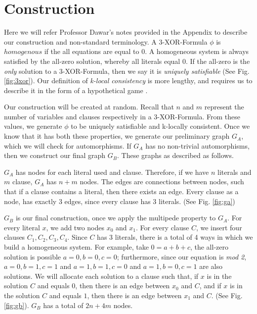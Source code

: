\newpage
\section[Construction]{Construction}
Here we will refer Professor Dawar's notes provided in the Appendix to describe our construction and non-standard terminology. A 3-XOR-Formula $\phi$ is $homogenous$ if the all equations are equal to 0. A homogeneous system is always satisfied by the all-zero solution, whereby all literals equal 0. If the all-zero is the \emph{only} solution to a 3-XOR-Formula, then we say it is \emph{uniquely satisfiable} (See Fig. \ref{fig:3xor}). Our definition of \emph{k-local consistency} is more lengthy, and requires us to describe it in the form of a hypothetical game \cite{}.
\par
Our construction will be created at random. Recall that $n$ and $m$ represent the number of variables and clauses respectively in a 3-XOR-Formula. From these values, we generate $\phi$ to be uniquely satisfiable and k-locally consistent. Once we know that it has both these properties, we generate our preliminary graph $G_A$, which we will check for automorphisms. If $G_A$ has no non-trivial automorphisms, then we construct our final graph $G_B$. These graphs as described as follows. 
\par
$G_A$ has nodes for each literal used and clause. Therefore, if we have $n$ literals and $m$ clause, $G_A$ has $n+m$ nodes. The edges are connections between nodes, such that if a clause contains a literal, then there exists an edge. Every clause as a node, has exactly 3 edges, since every clause has 3 literals. (See Fig. \ref{fig:ga})
\par
$G_B$ is our final construction, once we apply the multipede property to $G_A$. For every literal $x$, we add two nodes $x_{0}$ and $x_{1}$. For every clause $C$, we insert four clauses $C_{1}, C_{2}, C_{3}, C_{4}$. Since $C$ has 3 literals, there is a total of 4 ways in which we build a homogeneous system. For example, take $0=a+b+c$, the all-zero solution is possible $a=0,b=0,c=0$; furthermore, since our equation is \emph{mod 2}, $a=0,b=1,c=1$ and $a=1,b=1,c=0$ and $a=1,b=0,c=1$ are also solutions. We will allocate each solution to a clause such that, if $x$ is in the solution $C$ and equals $0$, then there is an edge between $x_0$ and $C$, and if $x$ is in the solution $C$ and equals $1$, then there is an edge between $x_1$ and $C$. (See Fig. \ref{fig:gb}). $G_{B}$ has a total of $2n+4m$ nodes.
